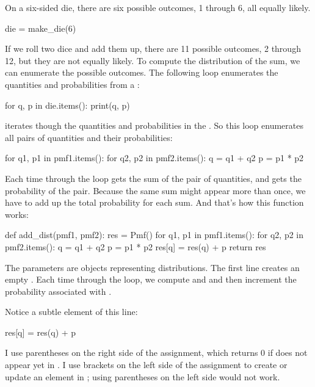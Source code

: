 \documentclass[12pt]{book}
\theoremstyle{exercise}
\begin{document}
On a six-sided die, there are six possible outcomes, 1 through 6, all equally likely.

\begin{code}
die = make_die(6)
\end{code}

If we roll two dice and add them up, there are 11 possible outcomes, 2 through 12, but they are not equally likely.
To compute the distribution of the sum, we can enumerate the possible outcomes.
The following loop enumerates the quantities and probabilities from a :

\begin{code}
for q, p in die.items():
    print(q, p)
\end{code}

 iterates though the quantities and probabilities in the .
So this loop enumerates all pairs of quantities and their probabilities:

\begin{code}
for q1, p1 in pmf1.items():
    for q2, p2 in pmf2.items():
        q = q1 + q2
        p = p1 * p2
\end{code}

Each time through the loop  gets the sum of the pair of quantities, and  gets the probability of the pair.
Because the same sum might appear more than once, we have to add up the total probability for each sum.
And that's how this function works:

\begin{code}
def add_dist(pmf1, pmf2):
    res = Pmf()
    for q1, p1 in pmf1.items():
        for q2, p2 in pmf2.items():
            q = q1 + q2
            p = p1 * p2
            res[q] = res(q) + p
    return res
\end{code}

The parameters are  objects representing distributions.
The first line creates an empty .
Each time through the loop, we compute  and  and then increment the probability associated with .

Notice a subtle element of this line:

\begin{code}
            res[q] = res(q) + p
\end{code}

I use parentheses on the right side of the assignment, which returns 0 if  does not appear yet in .
I use brackets on the left side of the assignment to create or update an element in ; using parentheses on the left side would not work.
\end{document}
